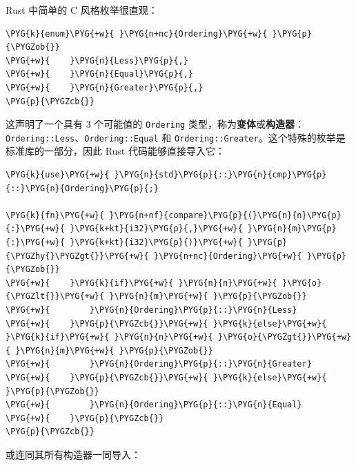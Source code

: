 Rust 中简单的 C 风格枚举很直观：

\begin{Verbatim}[commandchars=\\\{\},breaklines=true,breakanywhere=true,fontsize=\codefont,xleftmargin=17bp]
\PYG{k}{enum}\PYG{+w}{ }\PYG{n+nc}{Ordering}\PYG{+w}{ }\PYG{p}{\PYGZob{}}
\PYG{+w}{    }\PYG{n}{Less}\PYG{p}{,}
\PYG{+w}{    }\PYG{n}{Equal}\PYG{p}{,}
\PYG{+w}{    }\PYG{n}{Greater}\PYG{p}{,}
\PYG{p}{\PYGZcb{}}
\end{Verbatim}

这声明了一个具有 3 个可能值的 \texttt{Ordering} 类型，称为\textbf{变体}或\textbf{构造器}：\texttt{Ordering::Less}、\texttt{Ordering::Equal} 和 \texttt{Ordering::Greater}。这个特殊的枚举是标准库的一部分，因此 Rust 代码能够直接导入它：

\begin{Verbatim}[commandchars=\\\{\},breaklines=true,breakanywhere=true,fontsize=\codefont,xleftmargin=17bp]
\PYG{k}{use}\PYG{+w}{ }\PYG{n}{std}\PYG{p}{::}\PYG{n}{cmp}\PYG{p}{::}\PYG{n}{Ordering}\PYG{p}{;}

\PYG{k}{fn}\PYG{+w}{ }\PYG{n+nf}{compare}\PYG{p}{(}\PYG{n}{n}\PYG{p}{:}\PYG{+w}{ }\PYG{k+kt}{i32}\PYG{p}{,}\PYG{+w}{ }\PYG{n}{m}\PYG{p}{:}\PYG{+w}{ }\PYG{k+kt}{i32}\PYG{p}{)}\PYG{+w}{ }\PYG{p}{\PYGZhy{}\PYGZgt{}}\PYG{+w}{ }\PYG{n+nc}{Ordering}\PYG{+w}{ }\PYG{p}{\PYGZob{}}
\PYG{+w}{    }\PYG{k}{if}\PYG{+w}{ }\PYG{n}{n}\PYG{+w}{ }\PYG{o}{\PYGZlt{}}\PYG{+w}{ }\PYG{n}{m}\PYG{+w}{ }\PYG{p}{\PYGZob{}}
\PYG{+w}{        }\PYG{n}{Ordering}\PYG{p}{::}\PYG{n}{Less}
\PYG{+w}{    }\PYG{p}{\PYGZcb{}}\PYG{+w}{ }\PYG{k}{else}\PYG{+w}{ }\PYG{k}{if}\PYG{+w}{ }\PYG{n}{n}\PYG{+w}{ }\PYG{o}{\PYGZgt{}}\PYG{+w}{ }\PYG{n}{m}\PYG{+w}{ }\PYG{p}{\PYGZob{}}
\PYG{+w}{        }\PYG{n}{Ordering}\PYG{p}{::}\PYG{n}{Greater}
\PYG{+w}{    }\PYG{p}{\PYGZcb{}}\PYG{+w}{ }\PYG{k}{else}\PYG{+w}{ }\PYG{p}{\PYGZob{}}
\PYG{+w}{        }\PYG{n}{Ordering}\PYG{p}{::}\PYG{n}{Equal}
\PYG{+w}{    }\PYG{p}{\PYGZcb{}}
\PYG{p}{\PYGZcb{}}
\end{Verbatim}

或连同其所有构造器一同导入：


